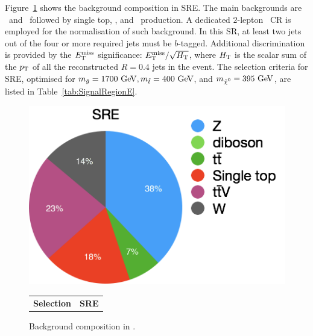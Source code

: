 				Figure~\ref{fig:SRE_bkgcomp} shows the background composition in SRE. The main backgrounds are \Zjets\ and \ttV\ followed by single top, \Wjets, and \ttbar\ production. A dedicated $2$-lepton \Zjets\ \ac{CR} is employed for the normalisation of such background.  In this \ac{SR}, at least two jets out of the four or more required jets must be $b$-tagged. Additional discrimination is provided by the $E_{\mathrm{T}}^{\mathrm{miss}}$ significance: $E_{\mathrm{T}}^{\mathrm{miss}}/\sqrt{H_{\mathrm{T}}}$, where $H_{\mathrm{T}}$ is the scalar sum of the $p_{\mathrm{T}}$ of all the reconstructed $R=0.4$ jets in the event. The selection criteria for SRE, optimised for $m_{\gluino} = 1700 \GeV, \mstop=400\GeV$, and $\mLSP=395\GeV$, are listed in Table~\ref{tab:SignalRegionE}.

				\begin{figure}[!htb]
					\centering
					\begin{minipage}[]{.5\textwidth}
						\centering
						\vspace{0pt}
						\includegraphics[width=\textwidth]{figures/stop/piechart_SREcomp}
						\caption{Background composition in \SRE.}
						\label{fig:SRE_bkgcomp}
					\end{minipage}\hfill
					\begin{minipage}[!htb]{.5\textwidth}
						\centering
						\vspace{0pt}
						\def\arraystretch{1.4}
							\begin{tabular}{lc}\toprule
							   {\textbf{Selection}}    & {\textbf{SRE}}\\

\end{tabular}
\end{minipage}
\end{figure}
